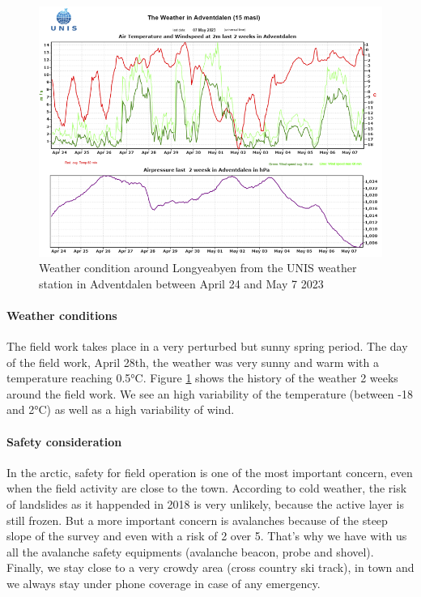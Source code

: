 \begin{figure}
    \centering
    \includegraphics[width=\linewidth]{Images/00_Methodology/WeatherConditions.png}
    \caption{Weather condition around Longyeabyen from the UNIS weather station in Adventdalen between April 24 and May 7 2023}
    \label{fig:weather}
\end{figure}


\paragraph{Weather conditions} The field work takes place in a very perturbed but sunny spring period. The day of the field work, April 28th, the weather was very sunny and warm with a temperature reaching 0.5°C. Figure \ref{fig:weather} shows the history of the weather 2 weeks around the field work. We see an high variability of the temperature (between -18 and 2°C) as well as a high variability of wind.


\paragraph{Safety consideration} In the arctic, safety for field operation is one of the most important concern, even when the field activity are close to the town. According to cold weather, the risk of landslides as it happended in 2018 is very unlikely, because the active layer is still frozen. But a more important concern is avalanches because of the steep slope of the survey and even with a risk of 2 over 5. That's why we have with us all the avalanche safety equipments (avalanche beacon, probe and shovel).
Finally, we stay close to a very crowdy area (cross country ski track), in town and we always stay under phone coverage in case of any emergency.

